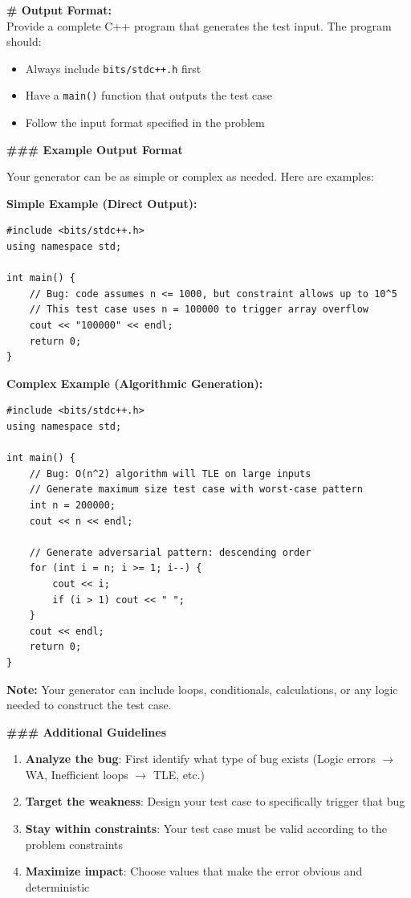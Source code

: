 \documentclass[11pt]{article}
\begin{document}
\begin{promptbox}
\vspace{0.5em}
\noindent\textbf{\# Output Format:} \\
Provide a complete C++ program that generates the test input. The program should:
\begin{itemize}
    \setlength\itemsep{0em}
    \item Always include \texttt{bits/stdc++.h} first
    \item Have a \texttt{main()} function that outputs the test case
    \item Follow the input format specified in the problem
\end{itemize}

\noindent\textbf{\#\#\# Example Output Format}

Your generator can be as simple or complex as needed. Here are examples:

\textbf{Simple Example (Direct Output):}
\begin{lstlisting}[style=cppstyle]
#include <bits/stdc++.h>
using namespace std;

int main() {
    // Bug: code assumes n <= 1000, but constraint allows up to 10^5
    // This test case uses n = 100000 to trigger array overflow
    cout << "100000" << endl;
    return 0;
}
\end{lstlisting}

\textbf{Complex Example (Algorithmic Generation):}
\begin{lstlisting}[style=cppstyle]
#include <bits/stdc++.h>
using namespace std;

int main() {
    // Bug: O(n^2) algorithm will TLE on large inputs
    // Generate maximum size test case with worst-case pattern
    int n = 200000;
    cout << n << endl;

    // Generate adversarial pattern: descending order
    for (int i = n; i >= 1; i--) {
        cout << i;
        if (i > 1) cout << " ";
    }
    cout << endl;
    return 0;
}
\end{lstlisting}

\textbf{Note:} Your generator can include loops, conditionals, calculations, or any logic needed to construct the test case.

\vspace{0.5em}
\noindent\textbf{\#\#\# Additional Guidelines}
\begin{enumerate}
    \setlength\itemsep{0em}
    \item \textbf{Analyze the bug}: First identify what type of bug exists (Logic errors $\to$ WA, Inefficient loops $\to$ TLE, etc.)
    \item \textbf{Target the weakness}: Design your test case to specifically trigger that bug
    \item \textbf{Stay within constraints}: Your test case must be valid according to the problem constraints
    \item \textbf{Maximize impact}: Choose values that make the error obvious and deterministic
\end{enumerate}



\end{promptbox}
\end{document}
